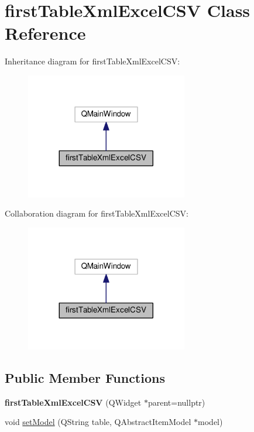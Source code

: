 \hypertarget{classfirstTableXmlExcelCSV}{}\section{first\+Table\+Xml\+Excel\+C\+SV Class Reference}
\label{classfirstTableXmlExcelCSV}


Inheritance diagram for first\+Table\+Xml\+Excel\+C\+SV\+:\nopagebreak
\begin{figure}[H]
\begin{center}
\leavevmode
\includegraphics[width=200pt]{classfirstTableXmlExcelCSV__inherit__graph}
\end{center}
\end{figure}


Collaboration diagram for first\+Table\+Xml\+Excel\+C\+SV\+:\nopagebreak
\begin{figure}[H]
\begin{center}
\leavevmode
\includegraphics[width=200pt]{classfirstTableXmlExcelCSV__coll__graph}
\end{center}
\end{figure}
\subsection*{Public Member Functions}
\begin{DoxyCompactItemize}
\item 
{\bfseries first\+Table\+Xml\+Excel\+C\+SV} (Q\+Widget $\ast$parent=nullptr)\hypertarget{classfirstTableXmlExcelCSV_ab444fbb8fb7e7433889875f0db199277}{}\label{classfirstTableXmlExcelCSV_ab444fbb8fb7e7433889875f0db199277}

\item 
void \hyperlink{classfirstTableXmlExcelCSV_a301b1fa4836f679d59b62a4785d69f32}{set\+Model} (Q\+String table, Q\+Abstract\+Item\+Model $\ast$model)
\end{DoxyCompactItemize}


